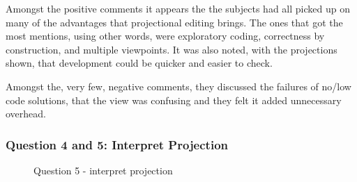 Amongst the positive comments it appears the the subjects had all picked up on many of the advantages that projectional editing brings.
The ones that got the most mentions, using other words, were exploratory coding, correctness by construction, and multiple viewpoints.
It was also noted, with the projections shown, that development could be quicker and easier to check.

Amongst the, very few, negative comments, they discussed the failures of no/low code solutions, that the view was confusing and they felt it added unnecessary overhead.

\subsubsection{Question 4 and 5: Interpret Projection}

\begin{figure}[H]
    \centering
    \caption{Question 5 - interpret projection}
    \label{fig:stackedbar_Q2}
\end{figure}

